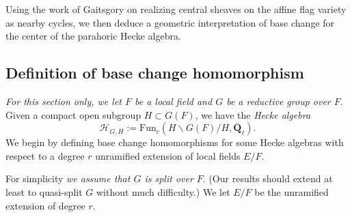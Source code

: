 \documentclass[reqno]{amsart}
\numberwithin{equation}{section}
\newcommand{\F}{\mathbf{F}}
\newcommand{\CC}{\mathbf{C}}
\newcommand{\Q}{\mathbf{Q}}
\newcommand{\ol}[1]{\overline{#1}}
\newcommand{\Cal}[1]{\mathcal{#1}}
\newcommand{\A}{\mathbf{A}}
\newcommand{\mrm}[1]{\mathrm{#1}}
\DeclareMathOperator{\GL}{GL}
\theoremstyle{remark}
\numberwithin{equation}{section}
\begin{document}

Using the work of Gaitsgory on realizing central sheaves on the affine flag variety as nearby cycles, we then deduce a geometric interpretation of base change for the center of the parahoric Hecke algebra. 


\subsection{Definition of base change homomorphism}\label{defn base change}

\emph{For this section only, we let $F$ be a local field and $G$ be a reductive  group over $F$}. Given a compact open subgroup $H \subset G(F)$, we have the \emph{Hecke algebra} 
\[
\Cal{H}_{G,H} := \mrm{Fun}_c(H \backslash G(F) /H, \ol{\Q}_{\ell}).
\]
We begin by defining base change homomorphisms for some Hecke algebras with respect to a degree $r$ unramified extension of local fields $E/F$. 

For simplicity \emph{we assume that $G$ is split over $F$}. (Our results should extend at least to quasi-split $G$ without much difficulty.) We let $E/F$ be the unramified extension of degree $r$.
\end{document}
